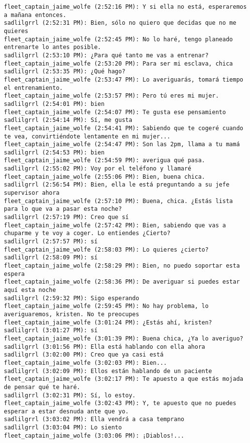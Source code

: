 \begin{verbatim}
fleet_captain_jaime_wolfe (2:52:16 PM): Y si ella no está, esperaremos a mañana entonces.
sadlilgrrl (2:52:31 PM): Bien, sólo no quiero que decidas que no me quieres
fleet_captain_jaime_wolfe (2:52:45 PM): No lo haré, tengo planeado entrenarte lo antes posible.
sadlilgrrl (2:53:10 PM): ¿Para qué tanto me vas a entrenar?
fleet_captain_jaime_wolfe (2:53:20 PM): Para ser mi esclava, chica
sadlilgrrl (2:53:35 PM): ¿Qué hago?
fleet_captain_jaime_wolfe (2:53:47 PM): Lo averiguarás, tomará tiempo el entrenamiento.
fleet_captain_jaime_wolfe (2:53:57 PM): Pero tú eres mi mujer.
sadlilgrrl (2:54:01 PM): bien
fleet_captain_jaime_wolfe (2:54:07 PM): Te gusta ese pensamiento
sadlilgrrl (2:54:14 PM): Sí, me gusta
fleet_captain_jaime_wolfe (2:54:41 PM): Sabiendo que te cogeré cuando te vea, convirtiéndote lentamente en mi mujer... 
fleet_captain_jaime_wolfe (2:54:47 PM): Son las 2pm, llama a tu mamá
sadlilgrrl (2:54:53 PM): bien
fleet_captain_jaime_wolfe (2:54:59 PM): averigua qué pasa.
sadlilgrrl (2:55:02 PM): Voy por el teléfono y llamaré
fleet_captain_jaime_wolfe (2:55:06 PM): Bien, buena chica.
sadlilgrrl (2:56:54 PM): Bien, ella le está preguntando a su jefe supervisor ahora
fleet_captain_jaime_wolfe (2:57:10 PM): Buena, chica. ¿Estás lista para lo que va a pasar esta noche?
sadlilgrrl (2:57:19 PM): Creo que sí
fleet_captain_jaime_wolfe (2:57:42 PM): Bien, sabiendo que vas a chuparme y te voy a coger. Lo entiendes ¿Cierto?
sadlilgrrl (2:57:57 PM): sí
fleet_captain_jaime_wolfe (2:58:03 PM): Lo quieres ¿cierto?
sadlilgrrl (2:58:09 PM): sí
fleet_captain_jaime_wolfe (2:58:29 PM): Bien, no puedo soportar esta espera
fleet_captain_jaime_wolfe (2:58:36 PM): De averiguar si puedes estar aquí esta noche
sadlilgrrl (2:59:32 PM): Sigo esperando
fleet_captain_jaime_wolfe (2:59:45 PM): No hay problema, lo averiguaremos, kristen. No te preocupes
fleet_captain_jaime_wolfe (3:01:24 PM): ¿Estás ahí, kristen?
sadlilgrrl (3:01:27 PM): sí
fleet_captain_jaime_wolfe (3:01:39 PM): Buena chica, ¿Ya lo averiguo?
sadlilgrrl (3:01:56 PM): Ella está hablando con ella ahora
sadlilgrrl (3:02:00 PM): Creo que ya casi está
fleet_captain_jaime_wolfe (3:02:03 PM): Bien...
sadlilgrrl (3:02:09 PM): Ellos están hablando de un paciente
fleet_captain_jaime_wolfe (3:02:17 PM): Te apuesto a que estás mojada de pensar qué te haré.
sadlilgrrl (3:02:31 PM): Sí, lo estoy.
fleet_captain_jaime_wolfe (3:02:43 PM): Y, te apuesto que no puedes esperar a estar desnuda ante que yo.
sadlilgrrl (3:03:02 PM): Ella vendrá a casa temprano
sadlilgrrl (3:03:04 PM): Lo siento
fleet_captain_jaime_wolfe (3:03:06 PM): ¡Diablos!...

\end{verbatim}
